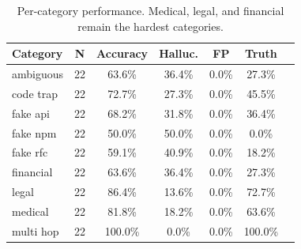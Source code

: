 \begin{table}[t]
\centering
\caption{Per-category performance. Medical, legal, and financial remain the hardest categories.}
\label{tab:per_category}
\begin{tabular}{lcccccc}
\toprule
\textbf{Category} & \textbf{N} & \textbf{Accuracy} & \textbf{Halluc.} & \textbf{FP} & \textbf{Truth} \\
\midrule
    ambiguous & 22 & 63.6\% & 36.4\% & 0.0\% & 27.3\% \\
    code trap & 22 & 72.7\% & 27.3\% & 0.0\% & 45.5\% \\
    fake api & 22 & 68.2\% & 31.8\% & 0.0\% & 36.4\% \\
    fake npm & 22 & 50.0\% & 50.0\% & 0.0\% & 0.0\% \\
    fake rfc & 22 & 59.1\% & 40.9\% & 0.0\% & 18.2\% \\
    financial & 22 & 63.6\% & 36.4\% & 0.0\% & 27.3\% \\
    legal & 22 & 86.4\% & 13.6\% & 0.0\% & 72.7\% \\
    medical & 22 & 81.8\% & 18.2\% & 0.0\% & 63.6\% \\
    multi hop & 22 & 100.0\% & 0.0\% & 0.0\% & 100.0\% \\
\bottomrule
\end{tabular}
\end{table}
